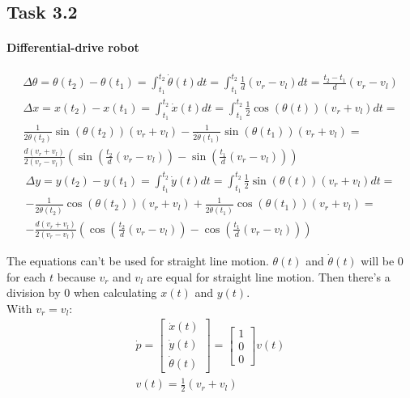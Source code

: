 \documentclass{article}
\begin{document}
	\subsection{Task 3.2}
	\paragraph{Differential-drive robot}
	
	\begin{gather}
	\Delta \theta = \theta(t_{2}) - \theta(t_{1}) = \int_{t_{1}}^{t_{2}} \dot{\theta}(t) dt = \int_{t_{1}}^{t_{2}} \frac{1}{d} (v_{r} - v_{l}) dt = \frac{t_{2} - t_{1}}{d} (v_{r} - v_{l})
	\end{gather}
	\begin{gather}
	\nonumber \Delta x = x(t_{2}) - x(t_{1}) = \int_{t_{1}}^{t_{2}} \dot{x}(t) dt = \int_{t_{1}}^{t_{2}} \frac{1}{2} \cos(\theta(t)) (v_{r} + v_{l}) dt =\\
	\nonumber \frac{1}{2 \dot{\theta}(t_{2})} \sin(\theta(t_{2})) (v_{r} + v_{l}) - \frac{1}{2 \dot{\theta}(t_{1})} \sin(\theta(t_{1})) (v_{r} + v_{l}) =\\
	\frac{d(v_{r} + v_{l})}{2(v_{r} - v_{l})}(\sin(\frac{t_{2}}{d}(v_{r} - v_{l})) - \sin(\frac{t_{1}}{d}(v_{r} - v_{l})))
	\end{gather}
	\begin{gather}
	\nonumber \Delta y = y(t_{2}) - y(t_{1}) = \int_{t_{1}}^{t_{2}} \dot{y}(t) dt = \int_{t_{1}}^{t_{2}} \frac{1}{2} \sin(\theta(t)) (v_{r} + v_{l}) dt =\\
	\nonumber -\frac{1}{2 \dot{\theta}(t_{2})} \cos(\theta(t_{2})) (v_{r} + v_{l}) + \frac{1}{2 \dot{\theta}(t_{1})} \cos(\theta(t_{1})) (v_{r} + v_{l}) =\\
	-\frac{d(v_{r} + v_{l})}{2(v_{r} - v_{l})}(\cos(\frac{t_{2}}{d}(v_{r} - v_{l})) - \cos(\frac{t_{1}}{d}(v_{r} - v_{l})))
	\end{gather}
	
	The equations can't be used for straight line motion. $\theta(t)$ and $\dot{\theta}(t)$ will be 0 for each $t$ because $v_{r}$ and $v_{l}$ are equal for straight line motion. Then there's a division by 0 when calculating $x(t)$ and $y(t)$.\\
	
	With $v_{r} = v_{l}$:
	\begin{gather}
	\dot{p} = 
	\begin{bmatrix}
	\dot{x}(t)\\
	\dot{y}(t)\\
	\dot{\theta}(t)
	\end{bmatrix} = 
	\begin{bmatrix}
	1\\
	0\\
	0
	\end{bmatrix} v(t)\\
	v(t) = \frac{1}{2}(v_{r} + v_{l})
	\end{gather}
	
\end{document}
